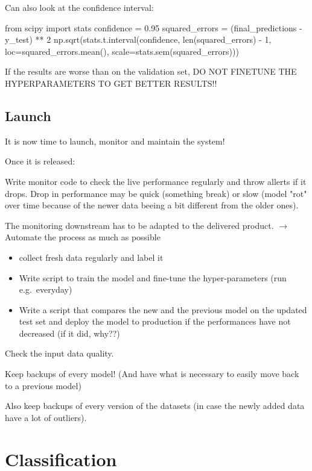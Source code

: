 \documentclass{article}
\begin{document}
        Can also look at the confidence interval:
        \begin{python}
            from scipy import stats
            confidence = 0.95
            squared_errors = (final_predictions - y_test) ** 2
            np.sqrt(stats.t.interval(confidence,
                            len(squared_errors) - 1,
                            loc=squared_errors.mean(),
                            scale=stats.sem(squared_errors)))
        \end{python}
        If the results are worse than on the validation set, DO NOT FINETUNE THE HYPERPARAMETERS TO GET BETTER RESULTS!!

    \subsection{Launch}
    It is now time to launch, monitor and maintain the system!

    Once it is released:

    Write monitor code to check the live performance regularly and throw allerts if it drops.
    Drop in performance may be quick (something break) or slow (model "rot" over time because of the newer data beeing a bit different from the older ones).

    The monitoring downstream has to be adapted to the delivered product.
    $\rightarrow$ Automate the process as much as possible
    \begin{itemize}
        \item collect fresh data regularly and label it
        \item Write script to train the model and fine-tune the hyper-parameters (run e.g.\ everyday)
        \item Write a script that compares the new and the previous model on the updated test set and deploy the model to production if the performances have not decreased (if it did, why??)
    \end{itemize}

    Check the input data quality.

    Keep backups of every model!
    (And have what is necessary to easily move back to a previous model)

    Also keep backups of every version of the datasets (in case the newly added data have a lot of outliers).

\newpage
\section{Classification}
\end{document}
